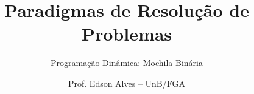 \title{Paradigmas de Resolução de Problemas}
\subtitle{Programação Dinâmica: Mochila Binária}
\author{Prof. Edson Alves -- UnB/FGA}
\date{}
